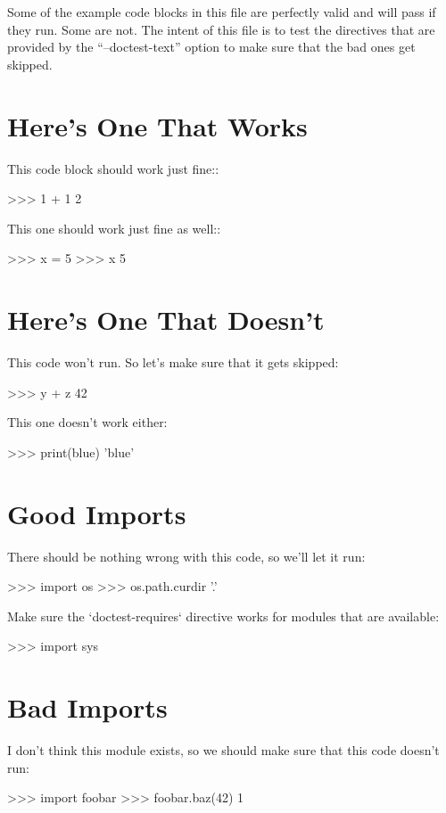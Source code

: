 \documentclass{article}
\begin{document}
Some of the example code blocks in this file are perfectly valid and will pass
if they run. Some are not. The intent of this file is to test the directives
that are provided by the ``--doctest-text'' option to make sure that the bad
ones get skipped.

\section{Here's One That Works}

This code block should work just fine::

\begin{python}
>>> 1 + 1
2

\end{python}

This one should work just fine as well::

\begin{python}
>>> x = 5
>>> x
5

\end{python}

\section{Here's One That Doesn't}

This code won't run. So let's make sure that it gets skipped:

\begin{python}
>>> y + z
42

\end{python}

This one doesn't work either:

\begin{python}
>>> print(blue)
'blue'

\end{python}

\section{Good Imports}

There should be nothing wrong with this code, so we'll let it run:

\begin{python}
>>> import os
>>> os.path.curdir
'.'

\end{python}

Make sure the `doctest-requires` directive works for modules that are
available:

\begin{python}
>>> import sys

\end{python}


\section{Bad Imports}


I don't think this module exists, so we should make sure that this code doesn't
run:

\begin{python}
>>> import foobar
>>> foobar.baz(42)
1

\end{python}
\end{document}
